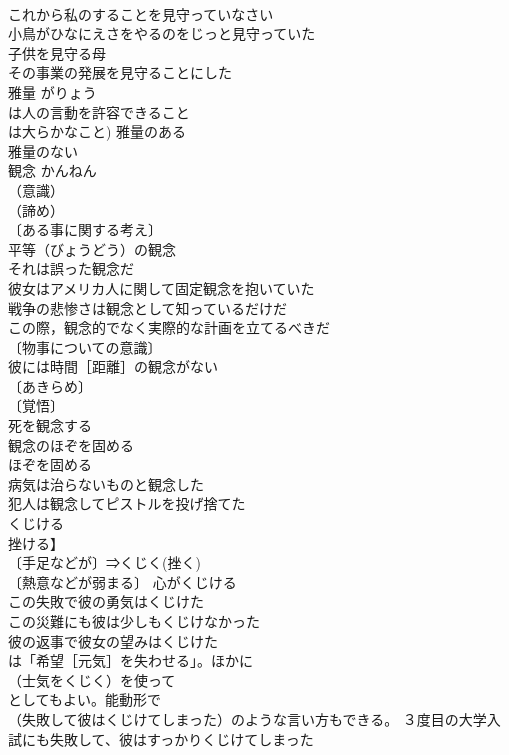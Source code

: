 \documentclass[8pt]{extreport}
\begin{document}
\begin{CJK}{UTF8}{min}
\\	これから私のすることを見守っていなさい 
\\	小鳥がひなにえさをやるのをじっと見守っていた 
\\	子供を見守る母 
\\	その事業の発展を見守ることにした 
\\	雅量	がりょう	
\\	は人の言動を許容できること
\\	は大らかなこと) 雅量のある 
\\	雅量のない 
\\	観念	かんねん	
\\	（意識）
\\	（諦め）
\\	〔ある事に関する考え〕
\\	平等（びょうどう）の観念 
\\	それは誤った観念だ 
\\	彼女はアメリカ人に関して固定観念を抱いていた 
\\	戦争の悲惨さは観念として知っているだけだ 
\\	この際，観念的でなく実際的な計画を立てるべきだ 
\\	〔物事についての意識〕
\\	彼には時間［距離］の観念がない 
\\	〔あきらめ〕
\\	〔覚悟〕
\\	死を観念する 
\\	観念のほぞを固める 
\\	ほぞを固める 
\\	病気は治らないものと観念した 
\\	犯人は観念してピストルを投げ捨てた 
\\	くじける	
\\	挫ける】	
\\	〔手足などが〕⇒くじく(挫く) 
\\	〔熱意などが弱まる〕 心がくじける 
\\	この失敗で彼の勇気はくじけた 
\\	この災難にも彼は少しもくじけなかった 
\\	彼の返事で彼女の望みはくじけた 
\\	は「希望［元気］を失わせる」。ほかに
\\	（士気をくじく）を使って
\\	としてもよい。能動形で
\\	（失敗して彼はくじけてしまった）のような言い方もできる。 ３度目の大学入試にも失敗して、彼はすっかりくじけてしまった 

\end{CJK}
\end{document}
